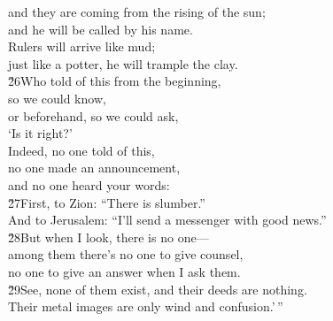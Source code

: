 \begin{poetry}
\poemll    and they are coming from the rising of the sun; \\
\poemlll       and he will be called by his name. \\
\poeml Rulers will arrive like mud; \\
\poemll    just like a potter, he will trample the clay. \\
\poeml \v{26}Who told of this from the beginning, \\
\poemll    so we could know, \\
\poeml or beforehand, so we could ask, \\
\poemll    `Is it right?' \\
\poeml Indeed, no one told of this, \\
\poemll    no one made an announcement, \\
\poemlll       and no one heard your words: \\
\poeml \v{27}First, to Zion: ``There is slumber.'' \\
\poemll    And to Jerusalem: ``I'll send a messenger with good news.'' \\
\poeml \v{28}But when I look, there is no one--- \\
\poemll    among them there's no one to give counsel, \\
\poemlll       no one to give an answer when I ask them. \\
\poeml \v{29}See, none of them exist, and their deeds are nothing. \\
\poemll    Their metal images are only wind and confusion.'\,''
\end{poetry}

